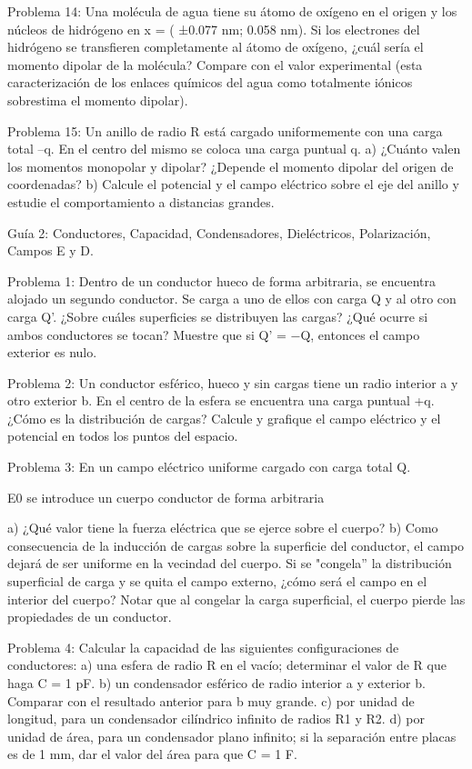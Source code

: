 Problema 14:
Una molécula de agua tiene su átomo de oxígeno en el origen y los núcleos de hidrógeno en x = ( ±0.077 nm; 0.058 nm). Si los electrones del hidrógeno se transfieren completamente al átomo de oxígeno, ¿cuál sería el momento dipolar de la molécula? Compare con el valor experimental (esta caracterización de los enlaces químicos del agua como totalmente iónicos sobrestima el momento dipolar).

Problema 15:
Un anillo de radio R está cargado uniformemente con una carga total –q. En el centro del mismo se coloca una carga puntual q.
a)	¿Cuánto valen los momentos monopolar y dipolar? ¿Depende el momento dipolar del origen de coordenadas?
b)	Calcule el potencial y el campo eléctrico sobre el eje del anillo y estudie el comportamiento a distancias grandes.
 



Guía 2: Conductores, Capacidad, Condensadores, Dieléctricos, Polarización, Campos E y D.

Problema 1:
Dentro de un conductor hueco de forma arbitraria, se encuentra alojado un segundo conductor. Se carga a uno de ellos con carga Q y al otro con carga Q'.
¿Sobre cuáles superficies se distribuyen las cargas?
¿Qué ocurre si ambos conductores se tocan?
Muestre que si Q' = −Q, entonces el campo exterior es nulo.



Problema 2:
Un conductor esférico, hueco y sin cargas tiene un radio interior a y otro exterior b. En el centro de la esfera se encuentra una carga puntual +q. ¿Cómo es la distribución de cargas? Calcule y grafique el campo  eléctrico y el potencial en todos los puntos del espacio.



 
Problema 3:
En un campo eléctrico uniforme cargado con carga total Q.
 


E0    se introduce un cuerpo conductor de forma arbitraria
 
a)	¿Qué valor tiene la fuerza eléctrica que se ejerce sobre el cuerpo?
b)	Como consecuencia de la inducción de cargas sobre la superficie del conductor, el campo dejará de ser uniforme en la vecindad del cuerpo. Si se "congela'' la distribución superficial de carga y se quita el campo externo, ¿cómo será el campo en el interior del cuerpo? Notar que al congelar la carga superficial, el cuerpo pierde las propiedades de un conductor.



Problema 4:
Calcular la capacidad de las siguientes configuraciones de conductores:
a)	una esfera de radio R en el vacío; determinar el valor de R que haga C = 1 pF.
b)	un condensador esférico de radio interior a y exterior b. Comparar con el resultado anterior para b muy grande.
c)	por unidad de longitud, para un condensador cilíndrico infinito de radios R1 y R2.
d)	por unidad de área, para un condensador plano infinito; si la separación entre placas es de 1
mm, dar el valor del área para que C = 1 F.



